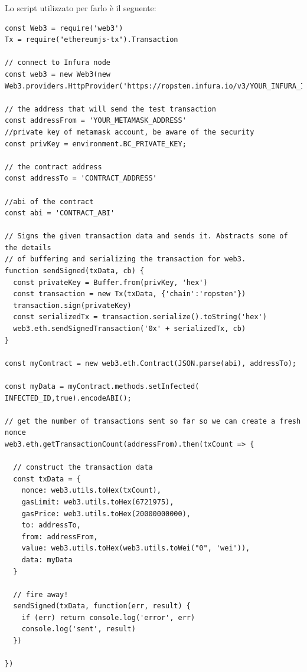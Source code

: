 Lo script utilizzato per farlo è il seguente:
\begin{lstlisting}
const Web3 = require('web3')
Tx = require("ethereumjs-tx").Transaction

// connect to Infura node
const web3 = new Web3(new Web3.providers.HttpProvider('https://ropsten.infura.io/v3/YOUR_INFURA_ID'))

// the address that will send the test transaction
const addressFrom = 'YOUR_METAMASK_ADDRESS'
//private key of metamask account, be aware of the security
const privKey = environment.BC_PRIVATE_KEY;

// the contract address
const addressTo = 'CONTRACT_ADDRESS'

//abi of the contract
const abi = 'CONTRACT_ABI'

// Signs the given transaction data and sends it. Abstracts some of the details 
// of buffering and serializing the transaction for web3.
function sendSigned(txData, cb) {
  const privateKey = Buffer.from(privKey, 'hex')
  const transaction = new Tx(txData, {'chain':'ropsten'})
  transaction.sign(privateKey)
  const serializedTx = transaction.serialize().toString('hex')
  web3.eth.sendSignedTransaction('0x' + serializedTx, cb)
}

const myContract = new web3.eth.Contract(JSON.parse(abi), addressTo);

const myData = myContract.methods.setInfected( INFECTED_ID,true).encodeABI();

// get the number of transactions sent so far so we can create a fresh nonce
web3.eth.getTransactionCount(addressFrom).then(txCount => {

  // construct the transaction data
  const txData = {
    nonce: web3.utils.toHex(txCount),
    gasLimit: web3.utils.toHex(6721975),
    gasPrice: web3.utils.toHex(20000000000), 
    to: addressTo,
    from: addressFrom,
    value: web3.utils.toHex(web3.utils.toWei("0", 'wei')),
    data: myData 
  }

  // fire away!
  sendSigned(txData, function(err, result) {
    if (err) return console.log('error', err)
    console.log('sent', result)
  })

})

\end{lstlisting}
